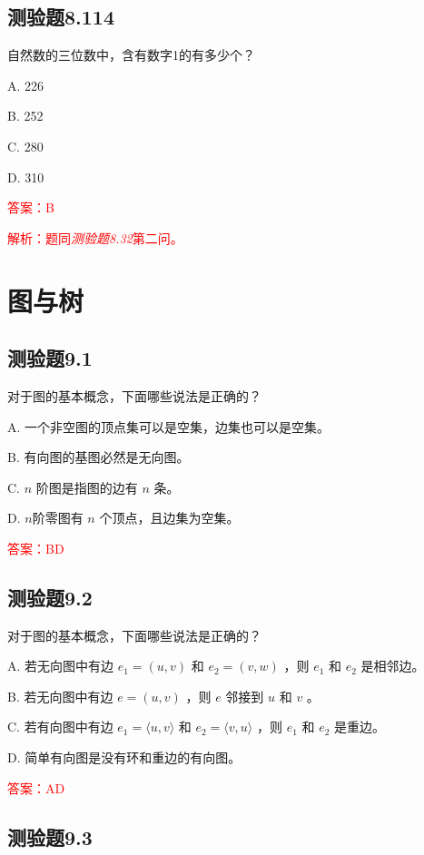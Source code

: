 \documentclass[UTF8, heading=true]{ctexart}
\begin{document}
\subsection{测验题8.114}

自然数的三位数中，含有数字1的有多少个？

A. 226

B. 252

C. 280

D. 310

\textcolor{red}{答案：B}

\textcolor{red}{解析：题同\textit{测验题8.32}第二问。}

\clearpage

\section{图与树}

\subsection{测验题9.1}

对于图的基本概念，下面哪些说法是正确的？

A. 一个非空图的顶点集可以是空集，边集也可以是空集。

B. 有向图的基图必然是无向图。

C. $n$ 阶图是指图的边有 $n$ 条。

D. $n$阶零图有 $n$ 个顶点，且边集为空集。

\textcolor{red}{答案：BD}

\subsection{测验题9.2}

对于图的基本概念，下面哪些说法是正确的？

A. 若无向图中有边 $e_1=(u, v)$ 和 $e_2=(v, w)$ ，则 $e_1$ 和 $e_2$ 是相邻边。

B. 若无向图中有边 $e=(u, v)$ ，则 $e$ 邻接到 $u$ 和 $v$ 。

C. 若有向图中有边 $e_1=\langle u, v\rangle$ 和 $e_2=\langle v, u\rangle$ ，则 $e_1$ 和 $e_2$ 是重边。

D. 简单有向图是没有环和重边的有向图。

\textcolor{red}{答案：AD}

\subsection{测验题9.3}
\end{document}
